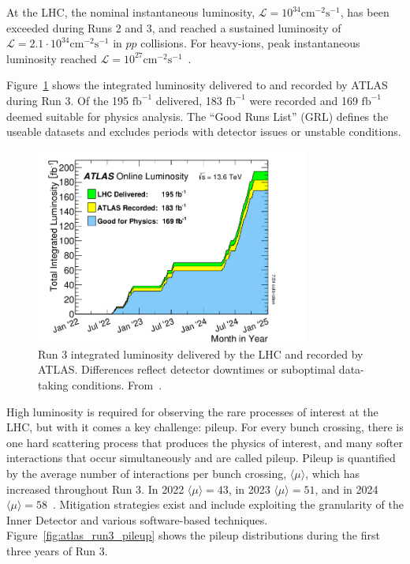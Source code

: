 At the LHC, the nominal instantaneous luminosity, $\mathcal{L} = 10^{34} \mathrm{cm}^{-2}\mathrm{s}^{-1}$, has been exceeded during Runs 2 and 3, and reached a sustained luminosity of $\mathcal{L} = 2.1 \cdot 10^{34} \mathrm{cm}^{-2}\mathrm{s}^{-1}$ in $pp$ collisions. For heavy-ions, peak instantaneous luminosity reached $\mathcal{L} = 10^{27} \mathrm{cm}^{-2}\mathrm{s}^{-1}$~\cite{ATLAS_run3_luminosity_and_detector}.

Figure~\ref{fig:atlas_luminosity_recorded} shows the integrated luminosity delivered to and recorded by ATLAS during Run 3\@. Of the 195 $\mathrm{fb}^{-1}$ delivered, 183 $\mathrm{fb}^{-1}$ were recorded and 169 $\mathrm{fb}^{-1}$ deemed suitable for physics analysis. The ``Good Runs List'' (GRL) defines the useable datasets and excludes periods with detector issues or unstable conditions.
\begin{figure}
    \centering
    \includegraphics[width=0.8\textwidth]{figures/atlas/atlas_run3_lumi.png}
    \caption{Run 3 integrated luminosity delivered by the LHC and recorded by ATLAS\@. Differences reflect detector downtimes or suboptimal data-taking conditions. From~\cite{atlas_lumi_image}.}\label{fig:atlas_luminosity_recorded}
\end{figure}

High luminosity is required for observing the rare processes of interest at the LHC, but with it comes a key challenge: pileup. For every bunch crossing, there is one hard scattering process that produces the physics of interest, and many softer interactions that occur simultaneously and are called pileup. Pileup is quantified by the average number of interactions per bunch crossing, $\langle \mu \rangle$, which has increased throughout Run 3. In 2022 $\langle \mu \rangle = 43$, in 2023 $\langle \mu \rangle = 51$, and in 2024 $\langle \mu \rangle = 58$~\cite{atlas_pileup_image}. Mitigation strategies exist and include exploiting the granularity of the Inner Detector and various software-based techniques. Figure~\ref{fig:atlas_run3_pileup} shows the pileup distributions during the first three years of Run 3.

